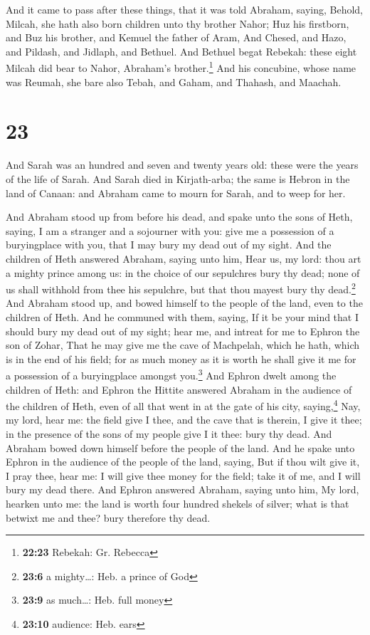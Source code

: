  And it came to pass after these things, that it was told
Abraham, saying, Behold, Milcah, she hath also born children unto thy
brother Nahor;  Huz his firstborn, and Buz his brother,
and Kemuel the father of Aram,  And Chesed, and Hazo, and
Pildash, and Jidlaph, and Bethuel.  And Bethuel begat
Rebekah: these eight Milcah did bear to Nahor, Abraham's
brother.\footnote{\textbf{22:23} Rebekah: Gr. Rebecca} 
And his concubine, whose name was Reumah, she bare also Tebah, and
Gaham, and Thahash, and Maachah.

\hypertarget{section-22}{%
\section{23}\label{section-22}}

 And Sarah was an hundred and seven and twenty years old:
these were the years of the life of Sarah.  And Sarah died
in Kirjath-arba; the same is Hebron in the land of Canaan: and Abraham
came to mourn for Sarah, and to weep for her.

 And Abraham stood up from before his dead, and spake unto
the sons of Heth, saying,  I am a stranger and a sojourner
with you: give me a possession of a buryingplace with you, that I may
bury my dead out of my sight.  And the children of Heth
answered Abraham, saying unto him,  Hear us, my lord: thou
art a mighty prince among us: in the choice of our sepulchres bury thy
dead; none of us shall withhold from thee his sepulchre, but that thou
mayest bury thy dead.\footnote{\textbf{23:6} a mighty\ldots: Heb. a
  prince of God}  And Abraham stood up, and bowed himself
to the people of the land, even to the children of Heth. 
And he communed with them, saying, If it be your mind that I should bury
my dead out of my sight; hear me, and intreat for me to Ephron the son
of Zohar,  That he may give me the cave of Machpelah,
which he hath, which is in the end of his field; for as much money as it
is worth he shall give it me for a possession of a buryingplace amongst
you.\footnote{\textbf{23:9} as much\ldots: Heb. full money}
 And Ephron dwelt among the children of Heth: and Ephron
the Hittite answered Abraham in the audience of the children of Heth,
even of all that went in at the gate of his city, saying,\footnote{\textbf{23:10}
  audience: Heb. ears}  Nay, my lord, hear me: the field
give I thee, and the cave that is therein, I give it thee; in the
presence of the sons of my people give I it thee: bury thy dead.
 And Abraham bowed down himself before the people of the
land.  And he spake unto Ephron in the audience of the
people of the land, saying, But if thou wilt give it, I pray thee, hear
me: I will give thee money for the field; take it of me, and I will bury
my dead there.  And Ephron answered Abraham, saying unto
him,  My lord, hearken unto me: the land is worth four
hundred shekels of silver; what is that betwixt me and thee? bury
therefore thy dead.

